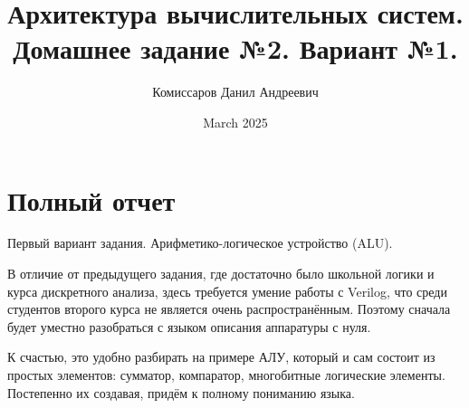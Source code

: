 \documentclass[a4paper,12pt]{article} %
\title{Архитектура вычислительных систем. Домашнее задание №2. Вариант №1.}
\author{Комиссаров Данил Андреевич}
\date{March 2025}
\begin{document}
\maketitle

\section{Полный отчет}
Первый вариант задания. Арифметико-логическое устройство (ALU).

В отличие от предыдущего задания, где достаточно было школьной логики и курса дискретного анализа, здесь требуется умение работы с Verilog, что среди студентов второго курса не является очень распространённым. Поэтому сначала будет уместно разобраться с языком описания аппаратуры с нуля.

К счастью, это удобно разбирать на примере АЛУ, который и сам состоит из простых элементов: сумматор, компаратор, многобитные логические элементы. Постепенно их создавая, придём к полному пониманию языка. 
\end{document}
